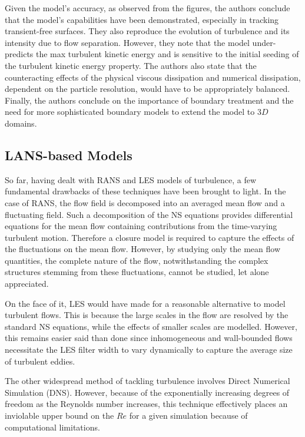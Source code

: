 Given the model's accuracy, as observed from the figures, the authors conclude that the model's capabilities have been demonstrated, especially in tracking transient-free surfaces. They also reproduce the evolution of turbulence and its intensity due to flow separation. 
However, they note that the model under-predicts the max turbulent kinetic energy and is sensitive to the initial seeding of the turbulent kinetic energy property.
The authors also state that the counteracting effects of the physical viscous dissipation and numerical dissipation, dependent on the particle resolution, would have to be appropriately balanced.
Finally, the authors conclude on the importance of boundary treatment and the need for more sophisticated boundary models to extend the model to $3D$ domains.


\subsection{LANS-based Models}
So far, having dealt with RANS and LES models of turbulence, a few fundamental drawbacks of these techniques have been brought to light.
In the case of RANS, the flow field is decomposed into
an averaged mean flow and a fluctuating field. Such a decomposition of the NS equations provides differential equations for the mean flow containing contributions from the time-varying turbulent motion. Therefore a closure model is required to capture the effects of the fluctuations on the mean flow. However, by studying only the mean flow quantities, the complete nature of the flow, notwithstanding the complex structures stemming from these fluctuations, cannot be studied, let alone appreciated.

On the face of it, LES would have made for a reasonable alternative to model turbulent flows. This is because the large scales in the flow are resolved by the standard NS equations, while the effects of smaller scales are modelled. However, this remains easier said than done since inhomogeneous and wall-bounded flows necessitate the LES filter width to vary dynamically to capture the average size of turbulent eddies.

The other widespread method of tackling turbulence involves Direct Numerical Simulation (DNS). However, because of the exponentially increasing degrees of freedom as the Reynolds number increases, this technique effectively places an inviolable upper bound on the $Re$ for a given simulation because of computational limitations.

